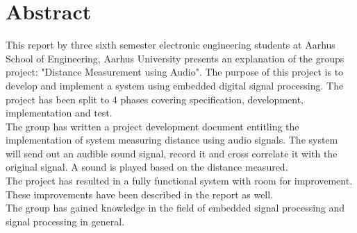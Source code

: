 \chapter{Abstract}
This report by three sixth semester electronic engineering students at Aarhus School of Engineering,  Aarhus University presents an explanation of the groups project: "Distance Measurement using Audio".  The purpose of this  project is to develop and implement a system using embedded digital signal processing. The project has been split to 4 phases covering specification, development, implementation and test.\\
The group has written a project development document entitling the implementation of system measuring distance using audio signals. The system will send out an audible sound signal, record it and cross correlate it with the original signal. A sound is played based on the distance measured.\\
The project has resulted in a fully  functional system with room for improvement. These improvements have been described in the report as well.\\
The group has gained knowledge in the field of embedded signal processing and signal processing in general.